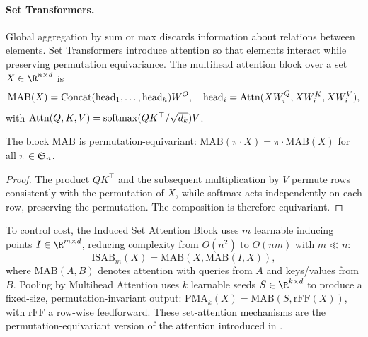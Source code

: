 \paragraph{Set Transformers.}
Global aggregation by sum or max discards information about relations between
elements. Set Transformers introduce attention so that elements interact while
preserving permutation equivariance. The multihead attention block over a set
$X \in \R^{n \times d}$ is
\begin{equation}
  \text{MAB}(X) = \operatorname{Concat}(\text{head}_1, \dots, \text{head}_h) W^O,
  \quad
  \text{head}_i = \operatorname{Attn}(X W_i^Q, X W_i^K, X W_i^V),
\end{equation}
with $\operatorname{Attn}(Q, K, V) = \operatorname{softmax}(QK^\top / \sqrt{d_k}) V$.

\begin{proposition}
\label{prop:groups:attention-equivariance}
The block $\text{MAB}$ is permutation-equivariant: $\text{MAB}(\pi \cdot X) =
\pi \cdot \text{MAB}(X)$ for all $\pi \in \mathfrak{S}_n$.
\end{proposition}

\begin{proof}
The product $QK^\top$ and the subsequent multiplication by $V$ permute rows
consistently with the permutation of $X$, while softmax acts independently on
each row, preserving the permutation. The composition is therefore equivariant.
\end{proof}

To control cost, the Induced Set Attention Block uses $m$ learnable inducing
points $I \in \R^{m \times d}$, reducing complexity from $O(n^2)$ to $O(nm)$ with
$m \ll n$:
\begin{equation}
  \text{ISAB}_m(X) = \text{MAB}(X, \text{MAB}(I, X)),
\end{equation}
where $\text{MAB}(A, B)$ denotes attention with queries from $A$ and keys/values
from $B$. Pooling by Multihead Attention uses $k$ learnable seeds $S \in \R^{k
\times d}$ to produce a fixed-size, permutation-invariant output:
$\text{PMA}_k(X) = \text{MAB}(S, \text{rFF}(X))$, with $\text{rFF}$ a row-wise
feedforward. These set-attention mechanisms are the permutation-equivariant
version of the attention introduced in .


